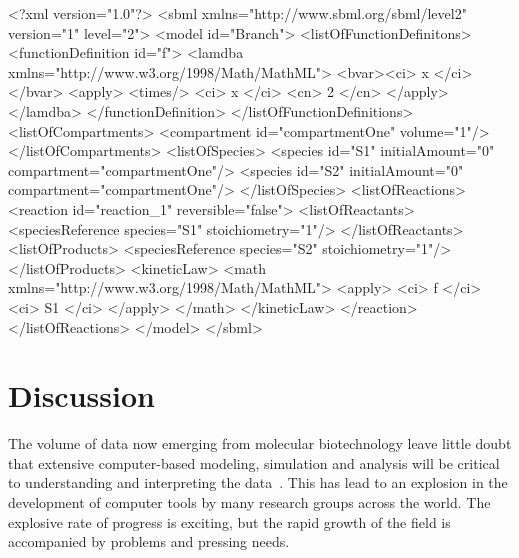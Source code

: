 \documentclass[10pt,twocolumntoc]{cekarticle}
\begin{document}
\begin{example}
<?xml version="1.0"?>
<sbml xmlns="http://www.sbml.org/sbml/level2" version="1" level="2">
    <model id="Branch">
        <listOfFunctionDefinitons>
            <functionDefinition id="f">
                <lamdba xmlns="http://www.w3.org/1998/Math/MathML">
                    <bvar><ci> x </ci></bvar>
                    <apply>
                        <times/>
                        <ci> x </ci>
                        <cn> 2 </cn>
                    </apply>
                </lamdba>
            </functionDefinition>
        </listOfFunctionDefinitions>
        <listOfCompartments>
            <compartment id="compartmentOne" volume="1"/>
        </listOfCompartments>
        <listOfSpecies>
            <species id="S1" initialAmount="0" compartment="compartmentOne"/>
            <species id="S2" initialAmount="0" compartment="compartmentOne"/>
        </listOfSpecies>
        <listOfReactions>
            <reaction id="reaction_1" reversible="false">
                <listOfReactants>
                    <speciesReference species="S1" stoichiometry="1"/>
                </listOfReactants>
                <listOfProducts>
                    <speciesReference species="S2" stoichiometry="1"/>
                </listOfProducts>
                <kineticLaw>
                    <math xmlns="http://www.w3.org/1998/Math/MathML">
                        <apply>
                            <ci> f </ci>
                            <ci> S1 </ci>
                         </apply>
                    </math>
                </kineticLaw>
            </reaction>
        </listOfReactions>
    </model>
</sbml>
\end{example}

\section{Discussion}
\label{sec:discussion}

The volume of data now emerging from molecular biotechnology
leave little doubt that extensive computer-based modeling, simulation and
analysis will be critical to understanding and interpreting the
data~\citep{abbott:1999,gilman:2000,popel:1998,smaglik:2000}.  This
has lead to an explosion in the development of computer tools by many
research groups across the world.  The explosive rate of progress is
exciting, but the rapid growth of the field is accompanied by problems and
pressing needs.
\end{document}
